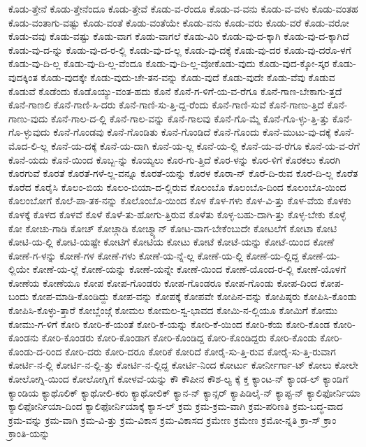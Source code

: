 {ಕೊಡು-ತ್ತೇನೆ
ಕೊಡು-ತ್ತೇನೆಂದೂ
ಕೊಡು-ತ್ತೇವೆ
ಕೊಡು-ವ-ರೆಂದೂ
ಕೊಡು-ವ-ವನು
ಕೊಡು-ವ-ವಳು
ಕೊಡು-ವಂತಹ
ಕೊಡು-ವಂತಾಗು-ವಷ್ಟು
ಕೊಡು-ವಂತೆ
ಕೊಡು-ವಂತೆಯೇ
ಕೊಡು-ವನು
ಕೊಡು-ವರು
ಕೊಡು-ವರೆ
ಕೊಡು-ವರೋ
ಕೊಡು-ವವು
ಕೊಡು-ವಷ್ಟು
ಕೊಡು-ವಾಗ
ಕೊಡು-ವಾಗಲೆ
ಕೊಡು-ವಿರಿ
ಕೊಡು-ವು-ದ-ಕ್ಕಾಗಿ
ಕೊಡು-ವು-ದ-ಕ್ಕಾಗಿದೆ
ಕೊಡು-ವು-ದ-ನ್ನು
ಕೊಡು-ವು-ದ-ರ-ಲ್ಲಿ
ಕೊಡು-ವು-ದ-ಲ್ಲ
ಕೊಡು-ವು-ದಕ್ಕೆ
ಕೊಡು-ವು-ದರ
ಕೊಡು-ವು-ದರೊ-ಳಗೆ
ಕೊಡು-ವು-ದಿ-ಲ್ಲ
ಕೊಡು-ವು-ದಿ-ಲ್ಲ-ವೆಂದೂ
ಕೊಡು-ವು-ದಿ-ಲ್ಲ-ವೋಕೊಡು-ವುದು
ಕೊಡು-ವುದ-ಕ್ಕೋ-ಸ್ಕರ
ಕೊಡು-ವುದಕ್ಕಿಂತ
ಕೊಡು-ವುದಕ್ಕೇ
ಕೊಡು-ವುದು-ಚೇ-ತನ-ವನ್ನು
ಕೊಡು-ವುದೆ
ಕೊಡು-ವುದೇ
ಕೊಡು-ವೆವು
ಕೊಡುವ
ಕೊಡುವೆ
ಕೊಡೆಂದು
ಕೊಡೊಯ್ಯು-ವಂತ-ಹದು
ಕೊನೆ
ಕೊನೆ-ಗ-ಳಿಗೆ-ಯ-ವ-ರೆಗೂ
ಕೊನೆ-ಗಾಣ-ಬೇಕಾಗು-ತ್ತದೆ
ಕೊನೆ-ಗಾಣಲಿ
ಕೊನೆ-ಗಾಣಿ-ಸಿ-ದರು
ಕೊನೆ-ಗಾಣಿ-ಸು-ತ್ತಿ-ದ್ದ-ರೆಂದು
ಕೊನೆ-ಗಾಣಿ-ಸುವೆ
ಕೊನೆ-ಗಾಣು-ತ್ತಿದೆ
ಕೊನೆ-ಗಾಣು-ವುದು
ಕೊನೆ-ಗಾಲ-ದ-ಲ್ಲಿ
ಕೊನೆ-ಗಾಲ-ವನ್ನು
ಕೊನೆ-ಗಾಲವು
ಕೊನೆ-ಗೊ-ಮ್ಮೆ
ಕೊನೆ-ಗೊ-ಳ್ಳು-ತ್ತಿ-ತ್ತು
ಕೊನೆ-ಗೊ-ಳ್ಳುವುದು
ಕೊನೆ-ಗೊಂಡವು
ಕೊನೆ-ಗೊಂಡಿತು
ಕೊನೆ-ಗೊಂಡಿದೆ
ಕೊನೆ-ಗೊಂದು
ಕೊನೆ-ಮುಟು-ವು-ದಕ್ಕೆ
ಕೊನೆ-ಮೊದ-ಲಿ-ಲ್ಲ
ಕೊನೆ-ಯ-ದಕ್ಕೆ
ಕೊನೆ-ಯ-ದಾಗಿ
ಕೊನೆ-ಯ-ಲ್ಲ
ಕೊನೆ-ಯ-ಲ್ಲಿ
ಕೊನೆ-ಯ-ವ-ರೆಗೂ
ಕೊನೆ-ಯ-ವ-ರೆಗೆ
ಕೊನೆ-ಯದು
ಕೊನೆ-ಯಿಂದ
ಕೊಬ್ಬ-ನ್ನು
ಕೊಯ್ಯಲು
ಕೊರ-ಗು-ತ್ತಿದೆ
ಕೊರ-ಳನ್ನು
ಕೊರ-ಳಿಗೆ
ಕೊರಕಲು
ಕೊರಗಿ
ಕೊರಗುವೆ
ಕೊರತೆ
ಕೊರತೆ-ಗಳೆ-ಲ್ಲ-ವನ್ನೂ
ಕೊರತೆ-ಯನ್ನು
ಕೊರಳ
ಕೊರಾ-ನ್
ಕೊರೆ-ದಿ-ರುವ
ಕೊರೆ-ದಿ-ಲ್ಲ
ಕೊರೆತ
ಕೊರೆದ
ಕೊರೈಸಿ
ಕೊಲಂ-ಬಿಯ
ಕೊಲಂ-ಬಿಯಾ-ದ-ಲ್ಲಿರುವ
ಕೊಲಂಬೊ
ಕೊಲಂಬೊ-ದಿಂದ
ಕೊಲಂಬೊ-ಯಿಂದ
ಕೊಲಂಬೋಗೆ
ಕೊಲೆ-ಪಾ-ತಕ-ನನ್ನು
ಕೊಲೊಂಬೊ-ಯಿಂದ
ಕೊಳ
ಕೊಳ-ಗಳು
ಕೊಳ-ವಿ-ತ್ತು
ಕೊಳ-ವೆಯ
ಕೊಳಕು
ಕೊಳಕ್ಕೆ
ಕೊಳದ
ಕೊಳವೆ
ಕೊಳೆ
ಕೊಳೆ-ತು-ಹೋಗು-ತ್ತಿರುವ
ಕೊಳೆತು
ಕೊಳ್ಳ-ಬಹು-ದಾಗಿ-ತ್ತು
ಕೊಳ್ಳ-ಬೇಕು
ಕೊಳ್ಳೆ
ಕೋ
ಕೋಚು-ಗಾಡಿ
ಕೋಚ್
ಕೋಚ್ಗಾಡಿ
ಕೋಚ್ಮ್ಯಾನ್
ಕೋಟ-ವಾಗ-ಬೇಕೆಂಬುದೇ
ಕೋಟಲೆಗೆ
ಕೋಟಾ
ಕೋಟಿ
ಕೋಟಿ-ಯ-ಲ್ಲಿ
ಕೋಟಿ-ಯಷ್ಟೇ
ಕೋಟಿಗೆ
ಕೋಟಿಯ
ಕೋಟು
ಕೋಟೆ
ಕೋಟೆ-ಯನ್ನು
ಕೋಟೆ-ಯಿಂದ
ಕೋಣೆ
ಕೋಣೆ-ಗ-ಳನ್ನು
ಕೋಣೆ-ಗಳ
ಕೋಣೆ-ಗಳು
ಕೋಣೆ-ಯ-ನ್ನೆ-ಲ್ಲ
ಕೋಣೆ-ಯ-ಲ್ಲಿ
ಕೋಣೆ-ಯ-ಲ್ಲಿದ್ದ
ಕೋಣೆ-ಯ-ಲ್ಲಿಯೇ
ಕೋಣೆ-ಯ-ಲ್ಲೆ
ಕೋಣೆ-ಯನ್ನು
ಕೋಣೆ-ಯನ್ನೇ
ಕೋಣೆ-ಯಿಂದ
ಕೋಣೆ-ಯೊಂದ-ರ-ಲ್ಲಿ
ಕೋಣೆ-ಯೊಳಗೆ
ಕೋಣೆಯ
ಕೋಣೆಯೂ
ಕೋಪ
ಕೋಪ-ಗೊಂಡರು
ಕೋಪ-ಗೊಂಡರೂ
ಕೋಪ-ಗೊಂಡು
ಕೋಪ-ದಿಂದ
ಕೋಪ-ಬಂದು
ಕೋಪ-ಮಾಡಿ-ಕೊಂಡಿದ್ದು
ಕೋಪ-ವನ್ನು
ಕೋಪಕ್ಕೆ
ಕೋಪವೇ
ಕೋಪಿನ-ವನ್ನು
ಕೋಪಿಷ್ಠರು
ಕೋಪಿಸಿ-ಕೊಂಡು
ಕೋಪಿಸಿ-ಕೊಳ್ಳು-ತ್ತಾರೆ
ಕೋಬ್ಲೆಂಜ್ಗೆ
ಕೋಮಲ
ಕೋಮಲ-ಸ್ವ-ಭಾವದ
ಕೋಮಿ-ನ-ಲ್ಲಿಯೂ
ಕೋಮಿಗೆ
ಕೋಮು
ಕೋಮು-ಗ-ಳಿಗೆ
ಕೋರಿ
ಕೋರಿ-ಕೆ-ಯಂತೆ
ಕೋರಿ-ಕೆ-ಯನ್ನು
ಕೋರಿ-ಕೆ-ಯಿಂದ
ಕೋರಿ-ಕೆಯ
ಕೋರಿ-ಕೊಂಡ
ಕೋರಿ-ಕೊಂಡನು
ಕೋರಿ-ಕೊಂಡರು
ಕೋರಿ-ಕೊಂಡಾಗ
ಕೋರಿ-ಕೊಂಡಿದ್ದ
ಕೋರಿ-ಕೊಂಡಿದ್ದರು
ಕೋರಿ-ಕೊಂಡು
ಕೋರಿ-ಕೊಂಡು-ದ-ರಿಂದ
ಕೋರಿ-ದರು
ಕೋರಿ-ದರೂ
ಕೋರಿಕೆ
ಕೋರಿದೆ
ಕೋರೈ-ಸು-ತ್ತಿ-ರುವ
ಕೋರೈ-ಸು-ತ್ತಿ-ರುವಾಗ
ಕೋರ್ಟಿ-ನ-ಲ್ಲಿ
ಕೋರ್ಟಿ-ನ-ಲ್ಲಿ-ತ್ತು
ಕೋರ್ಟಿ-ನ-ಲ್ಲಿದ್ದ
ಕೋರ್ಟಿ-ನಿಂದ
ಕೋರ್ಟು
ಕೋರ್ನೀರ್ಗಾ-ಟ್
ಕೋಲು
ಕೋಲೇ
ಕೋಲೋಗ್ನಿ-ಯಿಂದ
ಕೋಲೋಗ್ನಿಗೆ
ಕೋಳವೆ-ಯನ್ನು
ಕೌ
ಕೌಪೀನ
ಕೌಶ-ಲ್ಯ
ಕ್ಕೆ
ಕ್ತ
ಕ್ಯಾಂಟ-ನ್
ಕ್ಯಾಂಡ-ಲ್
ಕ್ಯಾಂಡಿಗೆ
ಕ್ಯಾಂಡಿಯ
ಕ್ಯಾಥೊಲಿಕ್
ಕ್ಯಾಥೋಲಿ-ಕರು
ಕ್ಯಾಥೋಲಿಕ್
ಕ್ಯಾನ-ನ್
ಕ್ಯಾನ್ಸರ್
ಕ್ಯಾಪಿಡಿಲೈ-ನ್
ಕ್ಯಾಪ್ಟ-ನ್
ಕ್ಯಾಲಿಫೋರ್ನಿಯಾ
ಕ್ಯಾಲಿಫೋರ್ನಿಯಾ-ದಿಂದ
ಕ್ಯಾಲಿಫೋರ್ನಿಯಾಕ್ಕೆ
ಕ್ಯಾಸ-ಲ್
ಕ್ರಮ
ಕ್ರಮ-ಕ್ರಮ-ವಾಗಿ
ಕ್ರಮ-ಪರಿಣತಿ
ಕ್ರಮ-ಬದ್ಧ-ವಾದ
ಕ್ರಮ-ವನ್ನು
ಕ್ರಮ-ವಾಗಿ
ಕ್ರಮ-ವಿ-ತ್ತು
ಕ್ರಮ-ವಿಕಾಸ
ಕ್ರಮ-ವಿಕಾಸದ
ಕ್ರಮೇಣ
ಕ್ರಮೇಣ
ಕ್ರಮೋ-ನ್ನತಿ
ಕ್ರಾ-ಸ್
ಕ್ರಾಂ
ಕ್ರಾಂತಿ-ಯನ್ನು
}
